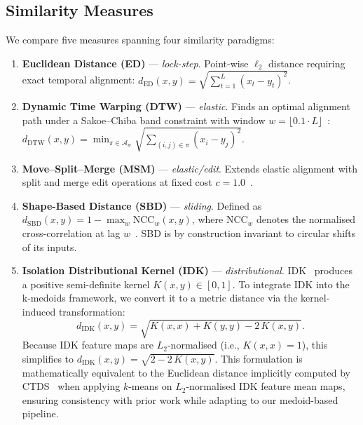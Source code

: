 \subsection{Similarity Measures}\label{sec:method-measures}

We compare five measures spanning four similarity paradigms:

\begin{enumerate}
    \item \textbf{Euclidean Distance (ED)} --- \emph{lock-step}.
    Point-wise $\ell_2$ distance requiring exact temporal alignment:
    $d_{\mathrm{ED}}(x, y) = \sqrt{\sum_{t=1}^{L}(x_t - y_t)^2}$.

    \item \textbf{Dynamic Time Warping (DTW)} --- \emph{elastic}.
    Finds an optimal alignment path under a Sakoe--Chiba band constraint with window $w = \lfloor 0.1 \cdot L \rfloor$~\cite{javed2020benchmark}:
    $d_{\mathrm{DTW}}(x, y) = \min_{\pi \in \mathcal{A}_w} \sqrt{\sum_{(i,j)\in\pi}(x_i - y_j)^2}$.

    \item \textbf{Move--Split--Merge (MSM)} --- \emph{elastic/edit}.
    Extends elastic alignment with split and merge edit operations at fixed cost $c = 1.0$~\cite{stefan2013msm,holder2023msm}.

    \item \textbf{Shape-Based Distance (SBD)} --- \emph{sliding}.
    Defined as $d_{\mathrm{SBD}}(x, y) = 1 - \max_w \mathrm{NCC}_w(x, y)$, where $\mathrm{NCC}_w$ denotes the normalised cross-correlation at lag $w$~\cite{paparrizos2015kshape}.
    SBD is by construction invariant to circular shifts of its inputs.

    \item \textbf{Isolation Distributional Kernel (IDK)} --- \emph{distributional}.
    IDK~\cite{ting2022idk} produces a positive semi-definite kernel $K(x, y) \in [0, 1]$.
    To integrate IDK into the k-medoids framework, we convert it to a metric distance via the kernel-induced transformation:
    \begin{equation}\label{eq:idk-distance}
        d_{\mathrm{IDK}}(x, y) = \sqrt{K(x,x) + K(y,y) - 2\,K(x,y)}.
    \end{equation}
    Because IDK feature maps are $L_2$-normalised (i.e., $K(x,x) = 1$), this simplifies to $d_{\mathrm{IDK}}(x,y) = \sqrt{2 - 2\,K(x,y)}$.
    This formulation is mathematically equivalent to the Euclidean distance implicitly computed by CTDS~\cite{gong2024ctds} when applying $k$-means on $L_2$-normalised IDK feature mean maps, ensuring consistency with prior work while adapting to our medoid-based pipeline.
\end{enumerate}

